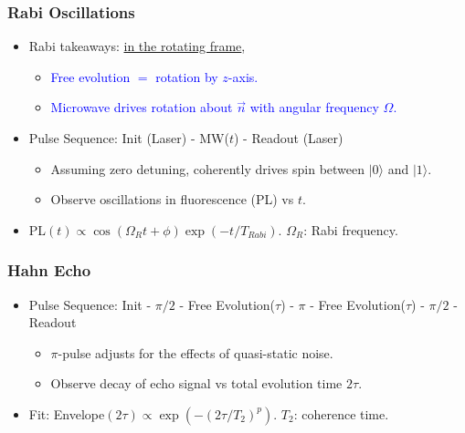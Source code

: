 \documentclass{beamer}
\begin{document}
\begin{frame}
\frametitle{Rabi Oscillations}
\begin{itemize}
    \item Rabi takeaways: \underline{in the rotating frame}, 
    \begin{itemize}
        \item \textcolor{blue}{Free evolution $=$ rotation by $z$-axis.} 
        \item \textcolor{blue}{Microwave drives rotation about $\vec{n}$ with angular frequency $\Omega$.} 
    \end{itemize}
    \item Pulse Sequence: Init (Laser) - MW($t$) - Readout (Laser)
    \begin{itemize}
        \item Assuming zero detuning, coherently drives spin between $|0\rangle$ and $|1\rangle$. 
        \item Observe oscillations in fluorescence (PL) vs $t$.
    \end{itemize}
    \item PL$(t) \propto \cos(\Omega_R t + \phi) \exp(-t/T_{Rabi})$. $\Omega_R$: Rabi frequency.
\end{itemize}
\end{frame}

\begin{frame}
\frametitle{Hahn Echo}
\begin{itemize}
    \item Pulse Sequence: Init - $\pi/2$ - Free Evolution($\tau$) - $\pi$ - Free Evolution($\tau$) - $\pi/2$ - Readout
    \begin{itemize}
        \item $\pi$-pulse adjusts for the effects of quasi-static noise. 
        \item Observe decay of echo signal vs total evolution time $2\tau$.
    \end{itemize}
    \item Fit: Envelope$(2\tau) \propto \exp(-(2\tau/T_2)^p)$. $T_2$: coherence time. 
\end{itemize}
\end{frame}
\end{document}

